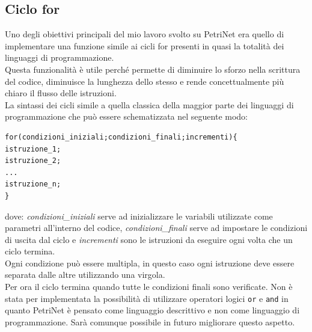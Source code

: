 \documentclass[italian,12pt]{book}
\begin{document}
\subsection{Ciclo for}
Uno degli obiettivi principali del mio lavoro svolto su PetriNet era
quello di implementare una funzione simile ai cicli for presenti in
quasi la totalità dei linguaggi di programmazione. \\
Questa funzionalità è utile perché permette di diminuire lo sforzo
nella scrittura del codice, diminuisce la lunghezza dello stesso e
rende concettualmente più chiaro il flusso delle istruzioni.\\
La sintassi dei cicli simile a quella classica della maggior parte dei
linguaggi di programmazione che può essere schematizzata nel seguente
modo:
\begin{verbatim}
for(condizioni_iniziali;condizioni_finali;incrementi){
istruzione_1;
istruzione_2;
...
istruzione_n;
}
\end{verbatim}
dove: \emph{condizioni\_iniziali} serve ad inizializzare le variabili
utilizzate come parametri all'interno del codice,
\emph{condizioni\_finali} serve ad impostare le condizioni di uscita
dal ciclo e \emph{incrementi} sono le istruzioni da eseguire ogni volta
che un ciclo termina. \\
Ogni condizione può essere multipla, in questo caso ogni istruzione
deve essere separata dalle altre utilizzando una virgola. \\
Per ora il ciclo termina quando tutte le condizioni finali sono verificate. 
Non è stata per implementata la possibilità di utilizzare operatori logici 
{\tt or} e {\tt and} in quanto PetriNet è pensato come linguaggio descrittivo
e non come linguaggio di programmazione. Sarà comunque possibile in futuro
migliorare questo aspetto.\\
\end{document}
